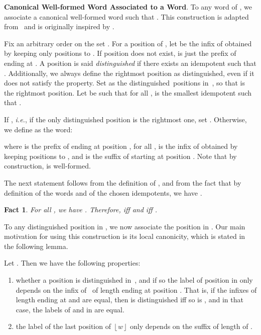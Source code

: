 \documentclass[a4paper,USenglish]{lipics}
\newcommand{\croch}[1]{\ensuremath{\left\lfloor #1 \right\rfloor}\xspace}
\newcommand\highlight[1]{\par\bigskip\noindent\textbf{\sffamily #1}.}
\theoremstyle{plain}
\newtheorem{fact}[theorem]{Fact}
\begin{document}
\highlight{Canonical Well-formed Word Associated to a Word} To any word 
of , we associate a canonical well-formed word  such that . This construction is
adapted from~\cite{PSDAD} and is originally inspired by \cite{Str85}.

Fix an arbitrary order on the set .
For a position  of , let  be the infix of  obtained by
keeping only positions  to . If position  does not
exist,  is just the prefix of  ending at . A position  is said
\emph{distinguished} if there exists an idempotent  such that
. Additionally, we always define the
rightmost position as distinguished, even if it does not satisfy the
property. Set  as the distinguished~positions in~, so
that  is the rightmost position. Let  be such
that for all ,  is the smallest idempotent such that
.

If , \emph{i.e.}, if the only distinguished position is the rightmost one,
set . Otherwise, we define  as the word:

\noindent where  is the prefix of  ending at position , for all ,  is the infix of  obtained by keeping positions 
to , and  is the suffix of  starting at position
. Note that by construction,  is well-formed.

The next statement follows from the definition of , and from the fact
that by definition of the words  and of the chosen idempotents, we have
.

\begin{fact} \label{fct:sametype}
  For all , we have . Therefore, 
  iff  and  iff .
\end{fact}

To any distinguished position  in , we now
associate the position  in . Our main
motivation for using this construction is its local canonicity, which is stated
in the following lemma.

\begin{lemma} \label{lem:canonic}
  Let . Then we have the following
  properties:
  \begin{enumerate}[label=,ref=]
  \item\label{item:5} whether a position  is distinguished in~, and if so the label of position 
    in  only depends on the infix of~ of length 
    ending at position . That is, if the infixes of length  ending at
     and  are equal, then  is distinguished iff so is , and in that case,
    the labels of  and  in  are equal.
  \item the label of the last position of \croch{w} only depends on
    the suffix of length  of .
  \end{enumerate}
\end{lemma}
\end{document}
